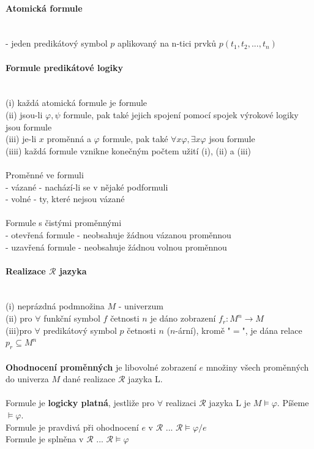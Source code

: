 \documentclass[a4]{report}
\theoremstyle{definition}
\begin{document}
\paragraph*{Atomická formule} ~\\
- jeden predikátový symbol $p$ aplikovaný na n-tici prvků $p(t_1,t_2,...,t_n)$
\paragraph*{Formule predikátové logiky} ~\\
(i) každá atomická formule je formule\\
(ii) jsou-li $\varphi , \psi$ formule, pak také jejich spojení pomocí spojek výrokové logiky jsou formule\\
(iii) je-li $x$ proměnná a $ \varphi $ formule, pak také $\forall x \varphi , \exists x \varphi$ jsou formule\\
(iiii) každá formule vznikne konečným počtem užití (i), (ii) a (iii)\\~\\
%
Proměnné ve formuli\\
- vázané - nachází-li se v nějaké podformuli\\
- volné - ty, které nejsou vázané\\~\\
%
Formule s čistými proměnnými\\
- otevřená formule - neobsahuje žádnou vázanou proměnnou\\
- uzavřená formule - neobsahuje žádnou volnou proměnnou

\paragraph*{Realizace $ \mathcal{R} $ jazyka} ~\\
(i) neprázdná podmnožina $M$ - univerzum\\
(ii) pro $\forall $ funkční symbol $f$ četnosti $n$ je dáno zobrazení $f_r : M^n \rightarrow M$\\
(iii)pro $\forall $ predikátový symbol $p$ četnosti $n$ ($n$-ární), kromě "$=$", je dána relace $p_r \subseteq M^n$\\~\\
%
\textbf{Ohodnocení proměnných} je libovolné zobrazení $e$ množiny všech proměnných do univerza $M$ dané realizace $\mathcal{R} $ jazyka L.\\~\\
%
Formule je \textbf{logicky platná}, jestliže pro $\forall $ realizaci $\mathcal{R} $ jazyka L je $M \models \varphi $. Píšeme $\models \varphi $.\\
Formule je pravdivá při ohodnocení $e$ v $\mathcal{R} $ ... $\mathcal{R} \models \varphi / e$\\
Formule je splněna v $\mathcal{R} $ ... $\mathcal{R} \models \varphi $
\end{document}
